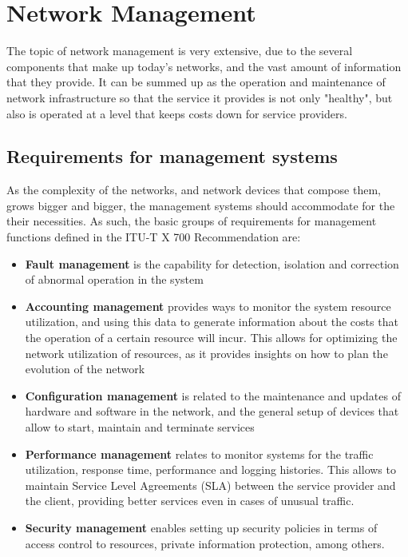 \section{Network Management} \label{chap:nm} 

\par The topic of network management is very extensive, due to the several components that make up today's networks, and the vast amount of information that they
provide. It can be summed up as the operation and maintenance of network infrastructure so that the service it provides is not only "healthy", but also is operated
at a level that keeps costs down for service providers. 

\subsection {Requirements for management systems}

\par As the complexity of the networks, and network devices that compose them, grows bigger and bigger, the management systems should accommodate for the their
necessities. As such, the basic groups of requirements for management functions  defined in the ITU-T X 700 Recommendation \cite{noauthor_recommendation_1992}
are:

\begin {itemize}
    \item \textbf {Fault management} is the capability for detection, isolation and correction of abnormal operation in the system
    \item \textbf {Accounting management} provides ways to monitor the system resource utilization, and using this data to generate information about the costs that
        the operation of a certain resource will incur. This allows for optimizing the network utilization of resources, as it provides insights on how to
        plan the evolution of the network
    \item \textbf {Configuration management} is related to the maintenance and updates of hardware and software in the network, and the general setup of devices 
        that allow to start, maintain and terminate services 
    \item \textbf {Performance management} relates to monitor systems for the traffic utilization, response time, performance and logging histories. This allows to 
        maintain Service Level Agreements (SLA) between the service provider and the client, providing better services even in cases of unusual traffic.
    \item \textbf {Security management} enables setting up security policies in terms of access control to resources, private information protection, among others.
\end {itemize}

